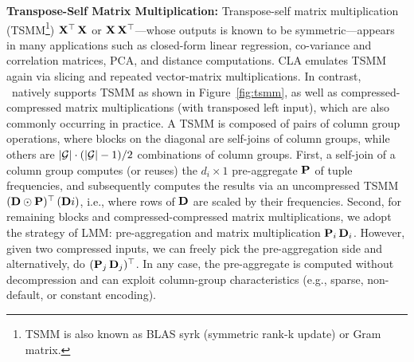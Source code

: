 \textbf{Transpose-Self Matrix Multiplication:} Transpose-self matrix multiplication (TSMM\footnote{TSMM is also known as BLAS syrk (symmetric rank-k update) or Gram matrix.}) $\mathbf{X}^{\top}\,\mathbf{X}$ or $\mathbf{X}\,\mathbf{X}^{\top}$---whose outputs is known to be symmetric---appears in many applications such as closed-form linear regression, co-variance and correlation matrices, PCA, and distance computations. CLA emulates TSMM again via slicing and repeated vector-matrix multiplications. In contrast, \name\ natively supports TSMM as shown in Figure~\ref{fig:tsmm}, as well as compressed-compressed matrix multiplications (with transposed left input), which are also commonly occurring in practice. A TSMM is composed of pairs of column group operations, where blocks on the diagonal are self-joins of column groups, while others are $\lvert \mathcal{G}\rvert\cdot(\lvert \mathcal{G}\rvert-1)/2$ combinations of column groups. First, a self-join of a column group computes (or reuses) the $d_i \times 1$ pre-aggregate $\mathbf{P}$ of tuple frequencies, and subsequently computes the results via an uncompressed TSMM $(\mathbf{D}\odot\mathbf{P})^{\top}\,(\mathbf{D}i)$, i.e., where rows of $\mathbf{D}$ are scaled by their frequencies. Second, for remaining blocks and compressed-compressed matrix multiplications, we adopt the strategy of LMM: pre-aggregation and matrix multiplication $\mathbf{P}_i\,\mathbf{D}_i$. However, given two compressed inputs, we can freely pick the pre-aggregation side and alternatively, do $(\mathbf{P}_j\,\mathbf{D}_j)^{\top}$. In any case, the pre-aggregate is computed without decompression and can exploit column-group characteristics (e.g., sparse, non-default, or constant encoding).

